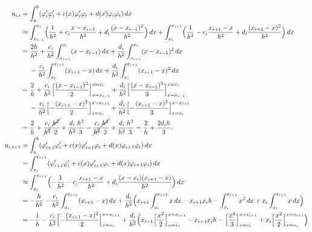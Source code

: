 \documentclass[a4paper, 10pt, oneside]{report}
\begin{document}
\begin{align*}
    a_{i,i} &= \int_a^b (\varphi_i'\varphi_i'+c(x)\varphi_i'\varphi_i+d(x)\varphi_i\varphi_i) \, dx \\
    &\approx \int_{x_{i-1}}^{x_{i}} \Bigl(\frac{1}{h^2}+c_i\frac{x-x_{i-1}}{h^2}+d_i\frac{(x-x_{i-1})^2}{h^2}\Bigr) \, dx + \int_{x_i}^{x_{i+1}} \Bigl(\frac{1}{h^2}-c_i\frac{x_{i+1}-x}{h^2}+d_i\frac{(x_{i+1}-x)^2}{h^2}\Bigr) \, dx \\
    &= \begin{aligned}[t]
        &\frac{2h}{h^2}+\frac{c_i}{h^2}\int_{x_{i-1}}^{x_i}(x-x_{i-1})\, dx + \frac{d_i}{h^2}\int_{x_{i-1}}^{x_i}(x-x_{i-1})^2\, dx \\
        &-\frac{c_i}{h^2}\int_{x_i}^{x_{i+1}}(x_{i+1}-x)\, dx + \frac{d_i}{h^2}\int_{x_i}^{x_{i+1}}(x_{i+1}-x)^2 \, dx
    \end{aligned} \\
    &= \begin{aligned}[t]
        &\frac{2}{h}+\frac{c_i}{h^2}\Bigl[\frac{(x-x_{i-1})^2}{2}\Bigr]_{x=x_{i-1}}^{x=x_i} + \frac{d_i}{h^2}\Bigl[\frac{(x-x_{i-1})^3}{3}\Bigr]_{x=x_{i-1}}^{x=x_i} \\
        &-\frac{c_i}{h^2}\Bigl[-\frac{(x_{i+1}-x)^2}{2}\Bigr]_{x=x_i}^{x=x_{i+1}} + \frac{d_i}{h^2}\Bigl[-\frac{(x_{i+1}-x)^3}{3}\Bigr]_{x=x_i}^{x=x_{i+1}}
    \end{aligned} \\
    &= \frac{2}{h}+\cancel{\frac{c_i}{h^2}\frac{h^2}{2}} + \frac{d_i}{h^2}\frac{h^3}{3} -\cancel{\frac{c_i}{h^2}\frac{h^2}{2}} + \frac{d_i}{h^2}\frac{h^3}{3} = \frac{2}{h}+\frac{2d_ih}{3}.\\
    a_{i,i+1} &= \int_a^b (\varphi_{i+1}'\varphi_i'+c(x)\varphi_{i+1}'\varphi_i+d(x)\varphi_{i+1}\varphi_i) \, dx \\
    &= \int_{x_i}^{x_{i+1}} (\varphi_{i+1}'\varphi_i'+c(x)\varphi_{i+1}'\varphi_i+d(x)\varphi_{i+1}\varphi_i) \, dx \\
    &\approx \int_{x_i}^{x_{i+1}} \Bigl(-\frac{1}{h^2}-c_i\frac{x_{i+1}-x}{h^2}+d_i\frac{(x-x_i)(x_{i+1}-x)}{h^2}\Bigr) \, dx \\
    &= -\frac{h}{h^2}-\frac{c_i}{h^2}\int_{x_i}^{x_{i+1}}(x_{i+1}-x)\, dx+\frac{d_i}{h^2}\Bigl(x_{i+1}\int_{x_i}^{x_{i+1}}x\, dx -x_{i+1}x_ih -\int_{x_i}^{x_{i+1}}x^2\, dx+x_i\int_{x_i}^{x_{i+1}}x\, dx\Bigr) \\
    &= -\frac{1}{h}-\frac{c_i}{h^2}\Bigl[-\frac{(x_{i+1}-x)^2}{2}\Bigr]_{x=x_i}^{x=x_{i+1}}+\frac{d_i}{h^2}\Bigl(x_{i+1}\Bigl[\frac{x^2}{2}\Bigr]_{x=x_i}^{x=x_{i+1}} -x_{i+1}x_ih -\Bigl[\frac{x^3}{3}\Bigr]_{x=x_i}^{x=x_{i+1}}+x_i\Bigl[\frac{x^2}{2}\Bigr]_{x=x_i}^{x=x_{i+1}}\Bigr) \\

\end{align*}
\end{document}
